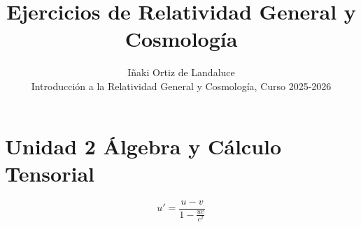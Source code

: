 \documentclass[12pt]{article}
\newenvironment{exercise}[2][Ejercicio]{\begin{trivlist} 
\item[\hskip \labelsep {\bfseries #1}\hskip \labelsep {\bfseries #2.}]}{\end{trivlist}}
\begin{document}
 
 
\title{Ejercicios de Relatividad General y Cosmología}
\author{Iñaki Ortiz de Landaluce\\ 
Introducción a la Relatividad General y Cosmología, Curso 2025-2026}
\date{} 
\maketitle

\section*{Unidad 2 Álgebra y Cálculo Tensorial}

\begin{exercise}{2.1} 
\[
u' = \frac{u - v}{1 - \frac{u v}{c^2}}
\]
\end{exercise}
 
\end{document}
